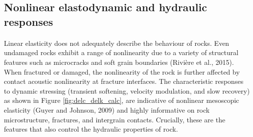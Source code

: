 \documentclass[letterpaper,10pt]{article}
\begin{document}
	\subsection{Nonlinear elastodynamic and hydraulic responses}
	\label{sec:results-nonlin_hydr_response}
	\paragraph{}
	Linear elasticity does not adequately describe the behaviour of rocks. Even undamaged rocks exhibit a range of nonlinearity due to a variety of structural features such as microcracks and soft grain boundaries (Rivi\`ere et al., 2015). When fractured or damaged, the nonlinearity of the rock is further affected by contact acoustic nonlinearity at fracture interfaces. The characteristic responses to dynamic stressing (transient softening, velocity modulation, and slow recovery) as shown in Figure \ref{fig:delc_delk_calc}, are indicative of nonlinear mesoscopic elasticity (Guyer and Johnson, 2009) and highly informative on rock microstructure, fractures, and intergrain contacts. Crucially, these are the features that also control the hydraulic properties of rock.
	
\end{document}
